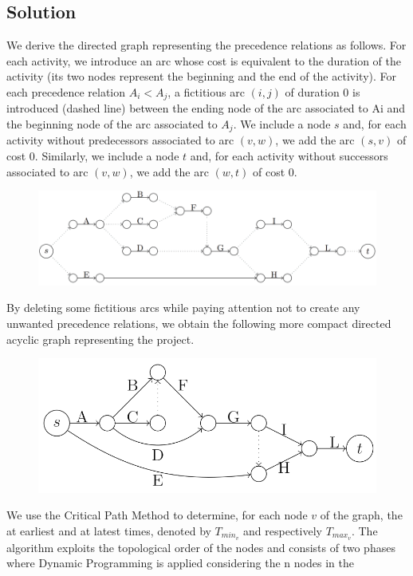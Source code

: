 \documentclass[12pt, a4paper]{report}
\newtheorem[style=M,bodystyle=\normalfont]{theorem}{Theorem}
\newtheorem[style=M,bodystyle=\normalfont]{corollary}{Corollary}
\newtheorem[style=M,bodystyle=\normalfont]{lemma}{Lemma}
\newtheorem[style=M,bodystyle=\normalfont]{definition}{Definition}
\begin{document}
    \subsection*{Solution}
        We derive the directed graph representing the precedence relations as follows. For each activity, we introduce an arc whose cost is equivalent to the duration of the 
        activity (its two nodes represent the beginning and the end of the activity). For each precedence relation $A_i < A_j$, a fictitious arc $(i, j)$ of duration 0 is 
        introduced (dashed line) between the ending node of the arc associated to Ai and the beginning node of the arc associated to $A_j$. We include a node $s$ and, 
        for each activity without predecessors associated to arc $(v, w)$, we add the arc $(s, v)$ of cost 0. Similarly, we include a node $t$ and, for each activity 
        without successors associated to arc $(v, w)$, we add the arc $(w, t)$ of cost 0.
        \begin{figure}[H]
            \centering
            \includegraphics[width=0.9\linewidth]{images/prog.png}
        \end{figure}
        By deleting some fictitious arcs while paying attention not to create any unwanted precedence relations, we obtain the following more compact directed 
        acyclic graph representing the project. 
        \begin{figure}[H]
            \centering
            \includegraphics[width=0.75\linewidth]{images/prog1.png}
        \end{figure}
        We use the Critical Path Method to determine, for each node $v$ of the graph, the at earliest and at latest times, denoted by $T_{min_v}$ and respectively $T_{max_v}$.
        The algorithm exploits the topological order of the nodes and consists of two phases where Dynamic Programming is applied considering the n nodes in the 
\end{document}
